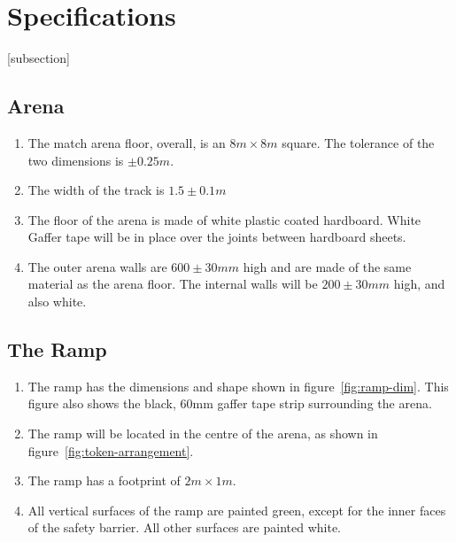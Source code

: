 \section{Specifications}
[subsection]
\newcommand{\rcnii}{\stepcounter{rulei}\arabic{section}.\arabic{subsection}.\arabic{rulei}}
\renewcommand{\labelenumi}{\rcnii}

\subsection{Arena}
\begin{enumerate}
\item The match arena floor, overall, is an $8m \times 8m$ square.
 The tolerance of the two dimensions is $\pm0.25m$.
\item The width of the track is $1.5\pm0.1m$
\item The floor of the arena is made of white plastic coated hardboard.
 White Gaffer tape will be in place over the joints between hardboard sheets.
\item The outer arena walls are $600\pm30mm$ high and are made of the same material as the arena floor.
 The internal walls will be $200\pm30mm$ high, and also white.
\end{enumerate}

\subsection{The Ramp}
\label{ramp}
\begin {enumerate} 
\item The ramp has the dimensions and shape shown in figure~\ref{fig:ramp-dim}.  This figure also shows the black, 60mm gaffer tape strip surrounding the arena.
\item The ramp will be located in the centre of the arena, as shown in figure~\ref{fig:token-arrangement}.
\item The ramp has a footprint of $2m \times 1m$.
\item All vertical surfaces of the ramp are painted green, except for the inner faces of the safety barrier.  All other surfaces are painted white.
\end {enumerate}

